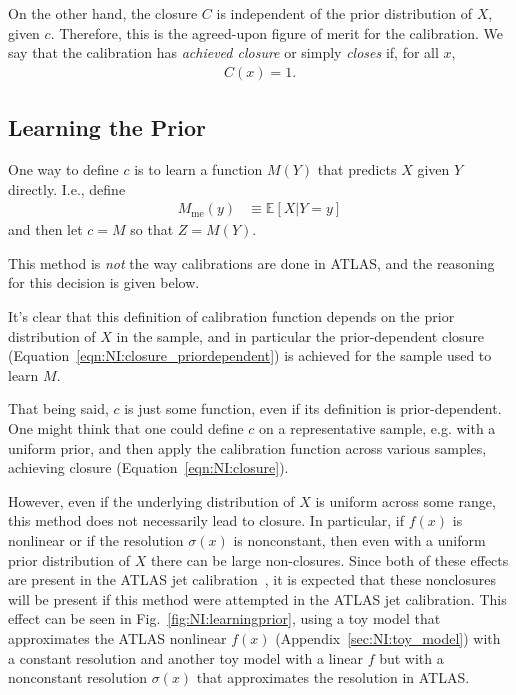 On the other hand, the closure $C$ is independent of the prior distribution of $X$, given $c$.
Therefore, this is the agreed-upon figure of merit for the calibration.
We say that the calibration has {\it achieved closure} or simply {\it closes} if, for all $x$,
\begin{align}
  C(x) = 1.
\end{align}

\subsection{Learning the Prior}
\label{sec:NI:learningprior}
One way to define $c$ is to learn a function $M(Y)$ that predicts $X$ given $Y$ directly.
I.e., define
\begin{align}
M_\text{me}(y)&\equiv\mathbb{E}[X|Y=y]
\end{align}
and then let $c=M$ so that $Z=M(Y)$.

This method is \emph{not} the way calibrations are done in ATLAS, and the reasoning for this decision is given below.

It's clear that this definition of calibration function depends on the prior distribution of $X$ in the sample, and in particular the prior-dependent closure (Equation~\ref{eqn:NI:closure_priordependent}) is achieved for the sample used to learn $M$.

That being said, $c$ is just some function, even if its definition is prior-dependent.
One might think that one could define $c$ on a representative sample, e.g. with a uniform prior, and then apply the calibration function across various samples, achieving closure (Equation~\ref{eqn:NI:closure}).

However, even if the underlying distribution of $X$ is uniform across some range, this method does not necessarily lead to closure.
In particular, if $f(x)$ is nonlinear or if the resolution $\sigma(x)$ is nonconstant, then even with a uniform prior distribution of $X$ there can be large non-closures.
Since both of these effects are present in the ATLAS jet calibration~\cite{Aad:2011he}, it is expected that these nonclosures will be present if this method were attempted in the ATLAS jet calibration.
This effect can be seen in Fig.~\ref{fig:NI:learningprior}, using a toy model that approximates the ATLAS nonlinear $f(x)$ (Appendix~\ref{sec:NI:toy_model}) with a constant resolution and another toy model with a linear $f$ but with a nonconstant resolution $\sigma(x)$ that approximates the resolution in ATLAS.

